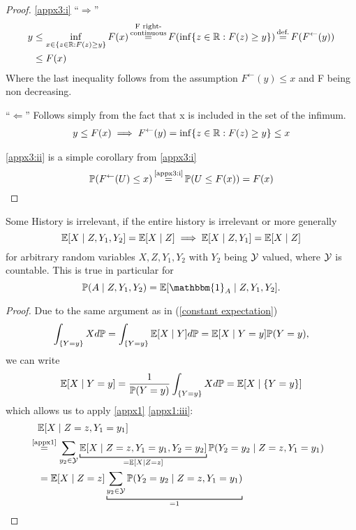 \begin{proof}
    \ref{appx3:i} ``\(\Rightarrow\)''
    \begin{align*}
        y&\le \inf_{x\in \{z\in\R: F(z)\ge y\}} F(x) 
        \xeq{\substack{
            \text{F right-}\\
            \text{continuous}}
        } F(\inf\{z\in\R: F(z)\ge y\})
        \xeq{\text{def.}} F(F^\leftarrow(y))\\
        &\le F(x)
    \end{align*}
    Where the last inequality follows from the assumption \(F^\leftarrow (y)\le x\) and F being non decreasing.

    \noindent ``\(\Leftarrow\)'' Follows simply from the fact that x is included in the set of the infimum. 
    \begin{align*}
        y\le F(x) \implies F^\leftarrow (y) = \inf\{z\in\mathbb{R}:F(z)\ge y\} \le x
    \end{align*}

    \noindent \ref{appx3:ii} is a simple corollary from \ref{appx3:i}
    \[
        \Pr(F^\leftarrow (U)\le x) 
        \xeq{\text{\ref{appx3:i}}} \Pr(U\le F(x)) = F(x) 
        \qedhere
    \]
\end{proof}

\begin{lemma}\label{appx7}
    Some History is irrelevant, if the entire history is irrelevant or more generally
    \[
        \mathbb{E}[X\mid Z, Y_1,Y_2]=\mathbb{E}[X\mid Z] \implies \mathbb{E}[X\mid Z, Y_1]=\mathbb{E}[X\mid Z]
    \]
    for arbitrary random variables \(X, Z, Y_1, Y_2\) with \(Y_2\) being \(\mathcal{Y}\) valued, where \(\mathcal{Y}\) is countable. This is true in particular for
    \[
        \Pr(A\mid Z, Y_1,Y_2)=\E[\mathbbm{1}_A \mid Z, Y_1,Y_2].
    \]
\end{lemma}
\begin{proof} Due to the same argument as in (\ref{constant expectation})
    \[
        \int_{\{Y=y\}} X d\mathbb{P} = \int_{\{Y=y\}} \mathbb{E}[X\mid Y]d\mathbb{P} = \mathbb{E}[X\mid Y=y] \mathbb{P}(Y=y),
    \]
    we can write
    \[
        \mathbb{E}[X\mid Y=y]=\frac{1}{\mathbb{P}(Y=y)}\int_{\{Y=y\}} X d\mathbb{P}=\mathbb{E}[X \mid \{Y=y\}]
    \]
    which allows us to apply \ref{appx1} \ref{appx1:iii}:
    \begin{align*}
        &\E[X\mid Z=z, Y_1=y_1]\\
        &\lxeq{\text{\ref{appx1}}}\sum_{y_2\in\cY} \underbracket[0.7pt]{\E[X\mid Z=z, Y_1=y_1, Y_2=y_2]}_{=\E[X\mid Z=z]} \Pr(Y_2=y_2\mid Z=z,Y_1=y_1)\\
        &=\E[X\mid Z=z] \underbracket[0.7pt]{\sum_{y_2\in\cY} \Pr(Y_2=y_2\mid Z=z,Y_1=y_1)}_{=1}\qedhere
    \end{align*}
\end{proof}

